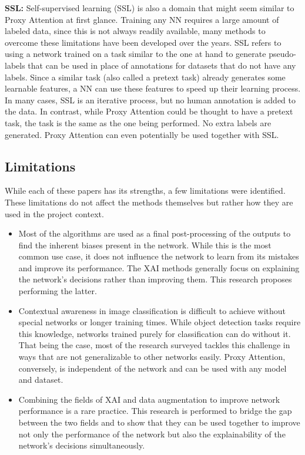 \textbf{SSL: }
Self-supervised learning (SSL) is also a domain that might seem similar to Proxy Attention at first glance. Training any NN requires a large amount of labeled data, since this is not always readily available, many methods to overcome these limitations have been developed over the years. SSL refers to using a network trained on a task similar to the one at hand to generate pseudo-labels that can be used in place of annotations for datasets that do not have any labels. Since a similar task (also called a pretext task) already generates some learnable features, a NN can use these features to speed up their learning process. In many cases, SSL is an iterative process, but no human annotation is added to the data. 
In contrast, while Proxy Attention could be thought to have a pretext task, the task is the same as the one being performed. No extra labels are generated. Proxy Attention can even potentially be used together with SSL.

\subsection{Limitations}
While each of these papers has its strengths, a few limitations were identified. These limitations do not affect the methods themselves but rather how they are used in the project context.
\begin{itemize}
    \item Most of the algorithms are used as a final post-processing of the outputs to find the inherent biases present in the network. While this is the most common use case, it does not influence the network to learn from its mistakes and improve its performance. The XAI methods generally focus on explaining the network's decisions rather than improving them. This research proposes performing the latter.
    \item Contextual awareness in image classification is difficult to achieve without special networks or longer training times. While object detection tasks require this knowledge, networks trained purely for classification can do without it. That being the case, most of the research surveyed tackles this challenge in ways that are not generalizable to other networks easily. Proxy Attention, conversely, is independent of the network and can be used with any model and dataset. 
    \item Combining the fields of XAI and data augmentation to improve network performance is a rare practice. This research is performed to bridge the gap between the two fields and to show that they can be used together to improve not only the performance of the network but also the explainability of the network's decisions simultaneously.

\end{itemize}